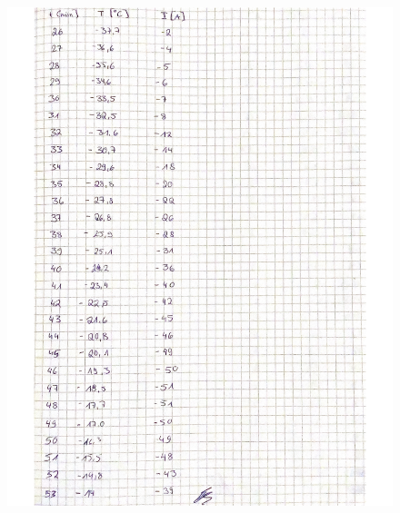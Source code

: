  \begin{figure}[H]
   \centering
   \includegraphics[width=\textwidth]{Bilder/Daten2.pdf}
   \label{fig:Messungen_2}
 \end{figure}
 

